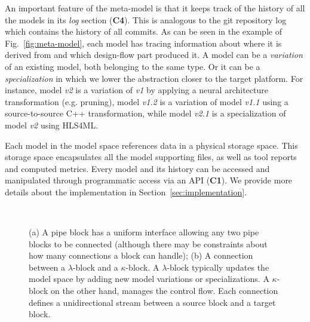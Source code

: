 An important feature of the meta-model is that it keeps track of the history of all the models in its \textit{log} section (\textbf{C4}). This is analogous to the git repository log which contains the history of all commits. As can be seen in the example of Fig.~\ref{fig:meta-model}, each model has tracing information about where it is derived from and which design-flow part produced it. A model can be a \textit{variation} of an existing model, both belonging to the same type. Or it can be a \textit{specialization} in which we lower the abstraction closer to the target platform. For instance, model \textit{v2} is a variation of \textit{v1} by applying a neural architecture transformation (e.g. pruning), model \textit{v1.2} is a variation of model \textit{v1.1} using a source-to-source C++ transformation, while model \textit{v2.1} is a specialization of model \textit{v2} using HLS4ML.

Each model in the model space references data in a physical storage space. This storage space encapsulates all the model supporting files, as well as tool reports and computed metrics. Every model and its history can be accessed and manipulated through programmatic access via an API (\textbf{C1}). We provide more details about the implementation in Section~\ref{sec:implementation}.


\begin{figure}[tp]
   \centering
   \\
  \vspace{0.2cm}
  \caption{(a) A pipe block has a uniform interface allowing any two pipe blocks to be connected (although there may be constraints about how many connections a block can handle); (b) A connection between a $\lambda$-block and a $\kappa$-block. A $\lambda$-block typically updates the model space by adding new model variations or specializations. A $\kappa$-block on the other hand, manages the control flow. Each connection defines a unidirectional stream between a source block and a target block.}
  \label{fig:pipeblocks} 
\end{figure}

